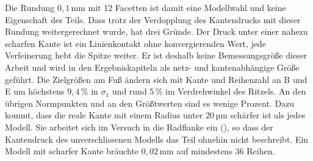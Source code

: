 Die Rundung $0{,}1$\,mm mit 12 Facetten ist damit eine Modellwahl und keine Eigenschaft des Teils. Dass trotz der Verdopplung des Kantendrucks mit dieser Rundung weitergerechnet wurde, hat drei Gründe. Der Druck unter einer nahezu scharfen Kante ist ein Linienkontakt ohne konvergierenden Wert, jede Verfeinerung hebt die Spitze weiter. Er ist deshalb keine Bemessungsgröße dieser Arbeit und wird in den Ergebniskapiteln als netz- und kantenabhängige Größe geführt. Die Zielgrößen am Fuß ändern sich mit Kante und Reihenzahl an B und E um höchstens $9{,}4$\,\% in $\sigma_{\mathrm{1}}$ und rund $5$\,\% im Verdrehwinkel des Ritzels. An den übrigen Normpunkten und an den Größtwerten sind es wenige Prozent. Dazu kommt, dass die reale Kante mit einem Radius unter $20$\,µm schärfer ist als jedes Modell. Sie arbeitet sich im Versuch in die Radflanke ein (), so dass der Kantendruck des unverschlissenen Modells das Teil ohnehin nicht beschreibt. Ein Modell mit scharfer Kante bräuchte $0{,}02$\,mm auf mindestens 36 Reihen.


